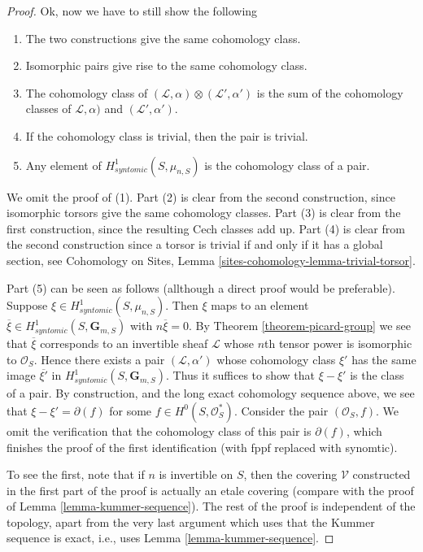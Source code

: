 \begin{proof}
\medskip\noindent
Ok, now we have to still show the following
\begin{enumerate}
\item The two constructions give the same cohomology class.
\item Isomorphic pairs give rise to the same cohomology class.
\item The cohomology class of
$(\mathcal{L}, \alpha) \otimes (\mathcal{L}', \alpha')$
is the sum of the cohomology classes of
$\mathcal{L}, \alpha)$ and $(\mathcal{L}', \alpha')$.
\item If the cohomology class is trivial, then the pair is trivial.
\item Any element of $H^1_{syntomic}(S, \mu_{n, S})$ is the
cohomology class of a pair.
\end{enumerate}
We omit the proof of (1). Part (2) is clear from the second construction,
since isomorphic torsors give the same cohomology classes.
Part (3) is clear from the first construction, since the resulting
Cech classes add up. Part (4) is clear from the second construction
since a torsor is trivial if and only if it has a global section, see
Cohomology on Sites, Lemma \ref{sites-cohomology-lemma-trivial-torsor}.

\medskip\noindent
Part (5) can be seen as follows (allthough a direct proof would be
preferable). Suppose $\xi \in H^1_{syntomic}(S, \mu_{n, S})$.
Then $\xi$ maps to an element
$\overline{\xi} \in H^1_{syntomic}(S, \mathbf{G}_{m, S})$
with $n \overline{\xi} = 0$. By
Theorem \ref{theorem-picard-group}
we see that $\overline{\xi}$ corresponds to an invertible sheaf $\mathcal{L}$
whose $n$th tensor power is isomorphic to $\mathcal{O}_S$.
Hence there exists a pair $(\mathcal{L}, \alpha')$ whose cohomology
class $\xi'$ has the same image $\overline{\xi'}$ in
$H^1_{syntomic}(S, \mathbf{G}_{m, S})$. Thus it suffices to show
that $\xi - \xi'$ is the class of a pair. By construction, and the
long exact cohomology sequence above, we see that
$\xi - \xi' = \partial(f)$ for some $f \in H^0(S, \mathcal{O}_S^*)$.
Consider the pair $(\mathcal{O}_S, f)$. We omit the verification
that the cohomology class of this pair is $\partial(f)$, which
finishes the proof of the first identification (with fppf replaced
with synomtic).

\medskip\noindent
To see the first, note that if $n$ is invertible on $S$, then the
covering $\mathcal{V}$ constructed in the first part of the proof
is actually an etale covering (compare with the proof of
Lemma \ref{lemma-kummer-sequence}). The rest of the proof is independent
of the topology, apart from the very last argument which uses that
the Kummer sequence is exact, i.e., uses Lemma \ref{lemma-kummer-sequence}.
\end{proof}






